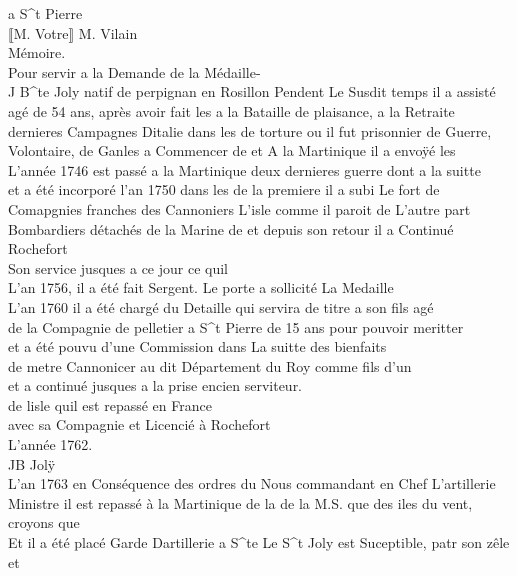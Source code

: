 \documentclass{article}
\begin{document}
\begin{pages}
a S\^{}t Pierre\\
⟦M. Votre⟧ M. Vilain\\
Mémoire.\\
Pour servir a la Demande de la Médaille-\\
J B\^{}te Joly natif de perpignan en Rosillon Pendent Le Susdit temps il a assisté\\
agé de 54 ans, après avoir fait les a la Bataille de plaisance, a la Retraite\\
dernieres Campagnes Ditalie dans les de torture ou il fut prisonnier de Guerre,\\
Volontaire, de Ganles a Commencer de et A la Martinique il a envoÿé les\\
L'année 1746 est passé a la Martinique deux dernieres guerre dont a la suitte\\
et a été incorporé l'an 1750 dans les de la premiere il a subi Le fort de\\
Comapgnies franches des Cannoniers L'isle comme il paroit de L'autre part\\
Bombardiers détachés de la Marine de et depuis son retour il a Continué\\
Rochefort\\
Son service jusques a ce jour ce quil\\
L'an 1756, il a été fait Sergent. Le porte a sollicité La Medaille\\
L'an 1760 il a été chargé du Detaille qui servira de titre a son fils agé\\
de la Compagnie de pelletier a S\^{}t Pierre de 15 ans pour pouvoir meritter\\
et a été pouvu d'une Commission dans La suitte des bienfaits\\
de metre Cannonicer au dit Département du Roy comme fils d'un\\
et a continué jusques a la prise encien serviteur.\\
de lisle quil est repassé en France\\
avec sa Compagnie et Licencié à Rochefort\\
L'année 1762.\\
JB Jolÿ\\
L'an 1763 en Conséquence des ordres du Nous commandant en Chef L'artillerie\\
Ministre il est repassé à la Martinique de la de la M.S. que des iles du vent, croyons que\\
Et il a été placé Garde Dartillerie a S\^{}te Le S\^{}t Joly est Suceptible, patr son zêle et\\

\end{pages}
\end{document}
